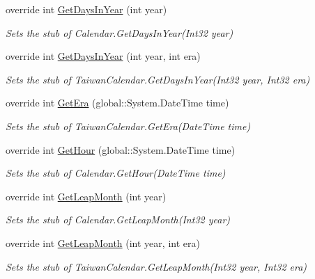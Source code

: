 \begin{DoxyCompactItemize}
override int \hyperlink{class_system_1_1_globalization_1_1_fakes_1_1_stub_taiwan_calendar_af720b777e67ea7e7ee3cfb2882e637a2}{Get\-Days\-In\-Year} (int year)
\begin{DoxyCompactList}\small\item\em Sets the stub of Calendar.\-Get\-Days\-In\-Year(\-Int32 year)\end{DoxyCompactList}\item 
override int \hyperlink{class_system_1_1_globalization_1_1_fakes_1_1_stub_taiwan_calendar_a0142c8ed5281f79ec2de893c07c6b23d}{Get\-Days\-In\-Year} (int year, int era)
\begin{DoxyCompactList}\small\item\em Sets the stub of Taiwan\-Calendar.\-Get\-Days\-In\-Year(\-Int32 year, Int32 era)\end{DoxyCompactList}\item 
override int \hyperlink{class_system_1_1_globalization_1_1_fakes_1_1_stub_taiwan_calendar_a133c5466bcb137bd9dc5eff0f5ce6b64}{Get\-Era} (global\-::\-System.\-Date\-Time time)
\begin{DoxyCompactList}\small\item\em Sets the stub of Taiwan\-Calendar.\-Get\-Era(\-Date\-Time time)\end{DoxyCompactList}\item 
override int \hyperlink{class_system_1_1_globalization_1_1_fakes_1_1_stub_taiwan_calendar_a9dac1e6bd3c6399f8c810b23a7e8a468}{Get\-Hour} (global\-::\-System.\-Date\-Time time)
\begin{DoxyCompactList}\small\item\em Sets the stub of Calendar.\-Get\-Hour(\-Date\-Time time)\end{DoxyCompactList}\item 
override int \hyperlink{class_system_1_1_globalization_1_1_fakes_1_1_stub_taiwan_calendar_a448e900ee42b20f6e1e1d44e8ca96792}{Get\-Leap\-Month} (int year)
\begin{DoxyCompactList}\small\item\em Sets the stub of Calendar.\-Get\-Leap\-Month(\-Int32 year)\end{DoxyCompactList}\item 
override int \hyperlink{class_system_1_1_globalization_1_1_fakes_1_1_stub_taiwan_calendar_ae81f783b0bfd7be6e8c64486257b6a37}{Get\-Leap\-Month} (int year, int era)
\begin{DoxyCompactList}\small\item\em Sets the stub of Taiwan\-Calendar.\-Get\-Leap\-Month(\-Int32 year, Int32 era)\end{DoxyCompactList}\item 

\end{DoxyCompactItemize}
